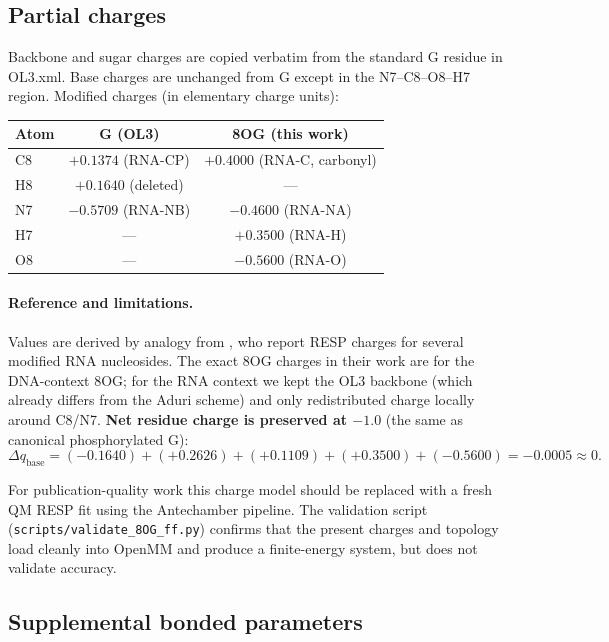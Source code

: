 \documentclass[11pt,a4paper]{article}
\begin{document}
\subsection{Partial charges}
\label{sec:ff:charges}

Backbone and sugar charges are copied verbatim from the standard G
residue in OL3.xml. Base charges are unchanged from G except in the
N7--C8--O8--H7 region. Modified charges (in elementary charge units):

\begin{tabular}{lcc}
\toprule
Atom & G (OL3) & 8OG (this work) \\
\midrule
C8       & $+0.1374$  (RNA-CP) & $+0.4000$ (RNA-C, carbonyl) \\
H8       & $+0.1640$  (deleted) & --- \\
N7       & $-0.5709$  (RNA-NB) & $-0.4600$ (RNA-NA) \\
H7       & ---                  & $+0.3500$ (RNA-H) \\
O8       & ---                  & $-0.5600$ (RNA-O) \\
\bottomrule
\end{tabular}

\paragraph{Reference and limitations.} Values are derived by analogy
from \citet{Aduri2007}, who report RESP charges for several modified
RNA nucleosides. The exact 8OG charges in their work are for the
DNA-context 8OG; for the RNA context we kept the OL3 backbone (which
already differs from the Aduri scheme) and only redistributed charge
locally around C8/N7. \textbf{Net residue charge is preserved at
$-1.0$} (the same as canonical phosphorylated G):
\begin{equation}
\Delta q_{\text{base}} =
   (-0.1640) + (+0.2626) + (+0.1109) + (+0.3500) + (-0.5600) = -0.0005 \approx 0.
\end{equation}

For publication-quality work this charge model should be replaced with
a fresh QM RESP fit using the Antechamber pipeline. The validation
script (\texttt{scripts/validate\_8OG\_ff.py}) confirms that the
present charges and topology load cleanly into OpenMM and produce a
finite-energy system, but does not validate accuracy.

\subsection{Supplemental bonded parameters}
\label{sec:ff:supp}
\end{document}
